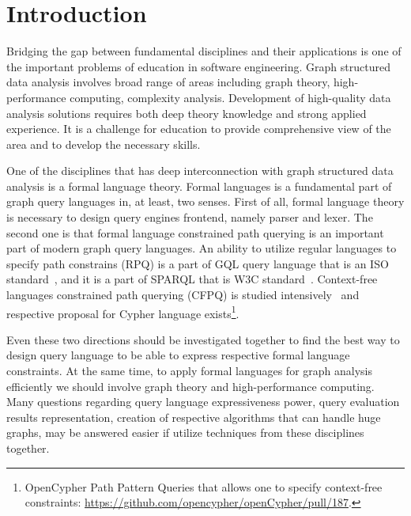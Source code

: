 \documentclass[sigconf]{acmart}
\begin{document}
\section{Introduction}

Bridging the gap between fundamental disciplines and their applications is one of the important problems of education in software engineering.
Graph structured data analysis involves broad range of areas including graph theory, high-performance computing, complexity analysis.
Development of high-quality data analysis solutions requires both deep theory knowledge and strong applied experience. 
It is a challenge for education to provide comprehensive view of the area and to develop the necessary skills.

One of the disciplines that has deep interconnection with graph structured data analysis is a formal language theory.
Formal languages is a fundamental part of graph query languages in, at least, two senses.
First of all, formal language theory is necessary to design query engines frontend, namely parser and lexer.
The second one is that formal language constrained path querying is an important part of modern graph query languages. 
An ability to utilize regular languages to specify path constrains (RPQ) is a part of GQL query language that is an ISO standard~\cite{2024gql}, and it is a part of SPARQL that is W3C standard~\cite{2013sparql}.
Context-free languages constrained path querying (CFPQ) is studied intensively~\cite{10.1145/3335783.3335791,10.1145/3167132.3167265,HELLINGS2025102475,10.1145/3398682.3399163} and respective proposal for Cypher language exists\footnote{OpenCypher Path Pattern Queries that allows one to specify context-free constraints: \url{https://github.com/opencypher/openCypher/pull/187}.}.

Even these two directions should be investigated together to find the best way to design query language to be able to express respective formal language constraints.
At the same time, to apply formal languages for graph analysis efficiently we should involve graph theory and high-performance computing.
Many questions regarding query language expressiveness power, query evaluation results representation, creation of respective algorithms that can handle huge graphs, may be answered easier if utilize techniques from these disciplines together.
\end{document}
